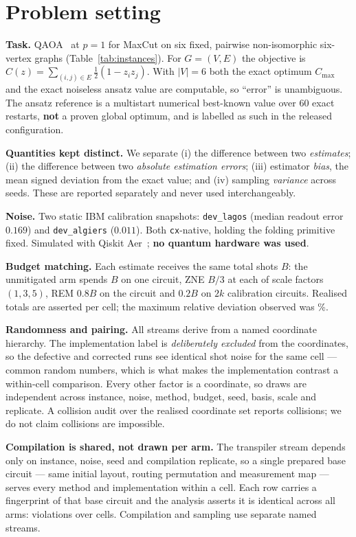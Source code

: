 \documentclass[10pt,conference]{IEEEtran}
\newcommand{\code}[1]{\texttt{\small #1}}
\begin{document}
\section{Problem setting}\label{sec:setting}
\textbf{Task.} QAOA~\cite{farhi2014qaoa} at $p=1$ for MaxCut on six fixed, pairwise non-isomorphic
six-vertex graphs (Table~\ref{tab:instances}). For $G=(V,E)$ the objective is
$C(z)=\sum_{(i,j)\in E}\tfrac12(1-z_iz_j)$. With $|V|=6$ both the exact optimum $C_{\max}$ and the
exact noiseless ansatz value are computable, so ``error'' is unambiguous. The ansatz reference is a
multistart numerical best-known value over 60 exact restarts, \textbf{not} a proven global optimum,
and is labelled as such in the released configuration.

\textbf{Quantities kept distinct.} We separate (i) the difference between two \emph{estimates};
(ii) the difference between two \emph{absolute estimation errors}; (iii) estimator \emph{bias}, the
mean signed deviation from the exact value; and (iv) sampling \emph{variance} across seeds. These
are reported separately and never used interchangeably.

\textbf{Noise.} Two static IBM calibration snapshots: \code{dev\_lagos} (median readout error
$0.169$) and \code{dev\_algiers} ($0.011$). Both \code{cx}-native, holding the folding primitive
fixed. Simulated with Qiskit Aer~\cite{javadiabhari2024qiskit}; \textbf{no quantum hardware was used}.

\textbf{Budget matching.} Each estimate receives the same total shots $B$: the unmitigated arm spends
$B$ on one circuit, ZNE $B/3$ at each of scale factors $(1,3,5)$, REM $0.8B$ on the circuit and
$0.2B$ on $2k$ calibration circuits. Realised totals are asserted per cell; the maximum relative
deviation observed was \BudgetMaxDev\%.

\textbf{Randomness and pairing.} All streams derive from a named coordinate hierarchy. The
implementation label is \emph{deliberately excluded} from the coordinates, so the defective and
corrected runs see identical shot noise for the same cell --- common random numbers, which is what
makes the implementation contrast a within-cell comparison. Every other factor is a coordinate, so
draws are independent across instance, noise, method, budget, seed, basis, scale and replicate. A
collision audit over the realised coordinate set reports \CollisionCount{} collisions; we do not
claim collisions are impossible.

\textbf{Compilation is shared, not drawn per arm.} The transpiler stream depends only on instance,
noise, seed and compilation replicate, so a single prepared base circuit --- same initial layout,
routing permutation and measurement map --- serves every method and implementation within a cell.
Each row carries a fingerprint of that base circuit and the analysis asserts it is identical across
all arms: \CompilationViolations{} violations over \CompilationCellsChecked{} cells. Compilation
and sampling use separate named streams.
\end{document}
